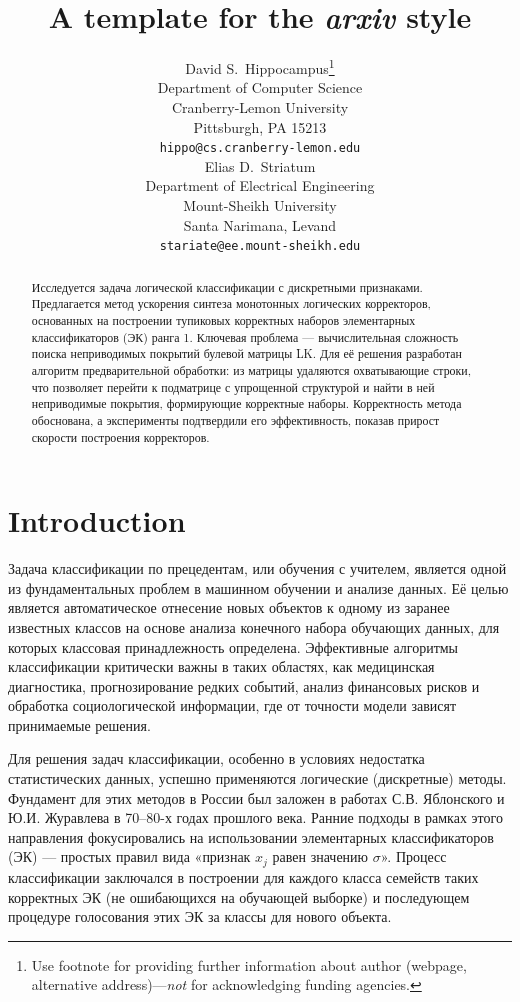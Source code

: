 \documentclass{article}
\title{A template for the \emph{arxiv} style}
\author{ David S.~Hippocampus\thanks{Use footnote for providing further
		information about author (webpage, alternative
		address)---\emph{not} for acknowledging funding agencies.} \\
	Department of Computer Science\\
	Cranberry-Lemon University\\
	Pittsburgh, PA 15213 \\
	\texttt{hippo@cs.cranberry-lemon.edu} \\
	\And
	Elias D.~Striatum \\
	Department of Electrical Engineering\\
	Mount-Sheikh University\\
	Santa Narimana, Levand \\
	\texttt{stariate@ee.mount-sheikh.edu} \\
}
\date{}
\begin{document}
\maketitle

\begin{abstract}
	Исследуется задача логической классификации с дискретными признаками. Предлагается метод ускорения синтеза монотонных логических корректоров, основанных на построении тупиковых корректных наборов элементарных классификаторов (ЭК) ранга 1. Ключевая проблема — вычислительная сложность поиска неприводимых покрытий булевой матрицы LK. Для её решения разработан алгоритм предварительной обработки: из матрицы удаляются охватывающие строки, что позволяет перейти к подматрице с упрощенной структурой и найти в ней неприводимые покрытия, формирующие корректные наборы. Корректность метода обоснована, а эксперименты подтвердили его эффективность, показав прирост скорости построения корректоров.
\end{abstract}



\section{Introduction}

Задача классификации по прецедентам, или обучения с учителем, является одной из фундаментальных проблем в машинном обучении и анализе данных. Её целью является автоматическое отнесение новых объектов к одному из заранее известных классов на основе анализа конечного набора обучающих данных, для которых классовая принадлежность определена. Эффективные алгоритмы классификации критически важны в таких областях, как медицинская диагностика, прогнозирование редких событий, анализ финансовых рисков и обработка социологической информации, где от точности модели зависят принимаемые решения.

Для решения задач классификации, особенно в условиях недостатка статистических данных, успешно применяются логические (дискретные) методы. Фундамент для этих методов в России был заложен в работах С.В. Яблонского и Ю.И. Журавлева в 70–80-х годах прошлого века. Ранние подходы в рамках этого направления фокусировались на использовании элементарных классификаторов (ЭК) — простых правил вида «признак $x_j$ равен значению $\sigma$». Процесс классификации заключался в построении для каждого класса семейств таких корректных ЭК (не ошибающихся на обучающей выборке) и последующем процедуре голосования этих ЭК за классы для нового объекта.
\end{document}
